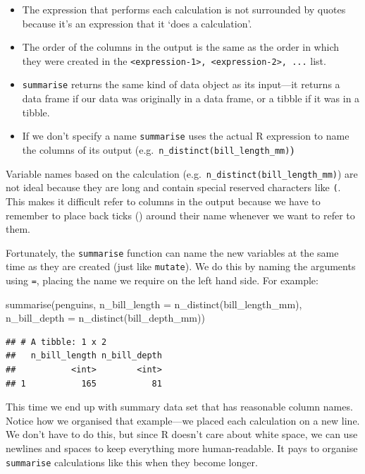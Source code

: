 \documentclass[
]{book}
\newenvironment{Shaded}{\begin{snugshade}}{\end{snugshade}}
\newcommand{\AttributeTok}[1]{\textcolor[rgb]{0.77,0.63,0.00}{#1}}
\newcommand{\FunctionTok}[1]{\textcolor[rgb]{0.00,0.00,0.00}{#1}}
\newcommand{\NormalTok}[1]{#1}
\providecommand{\tightlist}{%
  \setlength{\itemsep}{0pt}\setlength{\parskip}{0pt}}
\begin{document}
\begin{itemize}
\tightlist
\item
  The expression that performs each calculation is not surrounded by quotes because it's an expression that it `does a calculation'.
\item
  The order of the columns in the output is the same as the order in which they were created in the \texttt{\textless{}expression-1\textgreater{},\ \textless{}expression-2\textgreater{},\ ...} list.
\item
  \texttt{summarise} returns the same kind of data object as its input---it returns a data frame if our data was originally in a data frame, or a tibble if it was in a tibble.
\item
  If we don't specify a name \texttt{summarise} uses the actual R expression to name the columns of its output (e.g.~\texttt{n\_distinct(bill\_length\_mm)}\textbf{)}
\end{itemize}

Variable names based on the calculation (e.g.~\texttt{n\_distinct(bill\_length\_mm)}) are not ideal because they are long and contain special reserved characters like \texttt{(}. This makes it difficult refer to columns in the output because we have to remember to place back ticks (\texttt{\textasciigrave{}}) around their name whenever we want to refer to them.

Fortunately, the \texttt{summarise} function can name the new variables at the same time as they are created (just like \texttt{mutate}). We do this by naming the arguments using \texttt{=}, placing the name we require on the left hand side. For example:

\begin{Shaded}
\begin{Highlighting}[]
\FunctionTok{summarise}\NormalTok{(penguins, }
          \AttributeTok{n\_bill\_length =} \FunctionTok{n\_distinct}\NormalTok{(bill\_length\_mm), }
          \AttributeTok{n\_bill\_depth  =} \FunctionTok{n\_distinct}\NormalTok{(bill\_depth\_mm))}
\end{Highlighting}
\end{Shaded}

\begin{verbatim}
## # A tibble: 1 x 2
##   n_bill_length n_bill_depth
##           <int>        <int>
## 1           165           81
\end{verbatim}

This time we end up with summary data set that has reasonable column names. Notice how we organised that example---we placed each calculation on a new line. We don't have to do this, but since R doesn't care about white space, we can use newlines and spaces to keep everything more human-readable. It pays to organise \texttt{summarise} calculations like this when they become longer.
\end{document}
